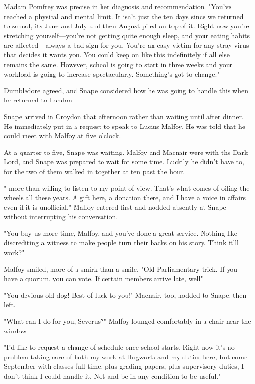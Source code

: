 Madam Pomfrey was precise in her diagnosis and recommendation. "You've reached a physical and mental limit. It isn't just the ten days since we returned to school, its June and July and then August piled on top of it. Right now you're stretching yourself—you're not getting quite enough sleep, and your eating habits are affected—always a bad sign for you. You're an easy victim for any stray virus that decides it wants you. You could keep on like this indefinitely if all else remains the same. However, school is going to start in three weeks and your workload is going to increase spectacularly. Something's got to change."

Dumbledore agreed, and Snape considered how he was going to handle this when he returned to London.

Snape arrived in Croydon that afternoon rather than waiting until after dinner. He immediately put in a request to speak to Lucius Malfoy. He was told that he could meet with Malfoy at five o'clock.

At a quarter to five, Snape was waiting. Malfoy and Macnair were with the Dark Lord, and Snape was prepared to wait for some time. Luckily he didn't have to, for the two of them walked in together at ten past the hour.

"{\el} more than willing to listen to my point of view. That's what comes of oiling the wheels all these years. A gift here, a donation there, and I have a voice in affairs even if it is unofficial." Malfoy entered first and nodded absently at Snape without interrupting his conversation.

"You buy us more time, Malfoy, and you've done a great service. Nothing like discrediting a witness to make people turn their backs on his story. Think it'll work?"

Malfoy smiled, more of a smirk than a smile. "Old Parliamentary trick. If you have a quorum, you can vote. If certain members arrive late, well{\el}"

"You devious old dog! Best of luck to you!" Macnair, too, nodded to Snape, then left.

"What can I do for you, Severus?" Malfoy lounged comfortably in a chair near the window.

"I'd like to request a change of schedule once school starts. Right now it's no problem taking care of both my work at Hogwarts and my duties here, but come September with classes full time, plus grading papers, plus supervisory duties, I don't think I could handle it. Not and be in any condition to be useful."

